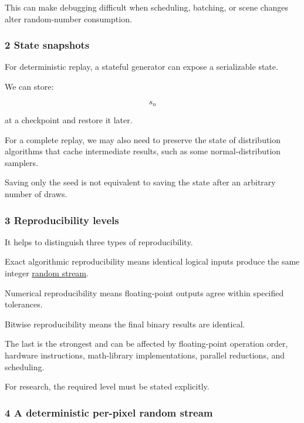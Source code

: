 This can make debugging difficult when scheduling, batching, or scene changes alter random-number consumption.

\subsubsection{2 State snapshots}\label{02-foundations-ii-ch029-state-snapshots}

For deterministic replay, a stateful generator can expose a serializable state.

We can store:

\[
 s_n
\]

at a checkpoint and restore it later.

For a complete replay, we may also need to preserve the state of distribution algorithms that cache intermediate results, such as some normal-distribution samplers.

Saving only the seed is not equivalent to saving the state after an arbitrary number of draws.

\subsubsection{3 Reproducibility levels}\label{02-foundations-ii-ch029-reproducibility-levels}

It helps to distinguish three types of reproducibility.

Exact algorithmic reproducibility means identical logical inputs produce the same integer \hyperref[02-foundations-ii-ch029-a-computer-produces-deterministic-pseudorandom-sequences]{random stream}.

Numerical reproducibility means floating-point outputs agree within specified tolerances.

Bitwise reproducibility means the final binary results are identical.

The last is the strongest and can be affected by floating-point operation order, hardware instructions, math-library implementations, parallel reductions, and scheduling.

For research, the required level must be stated explicitly.

\subsubsection{4 A deterministic per-pixel random stream}\label{02-foundations-ii-ch029-a-deterministic-per-pixel-random-stream}

